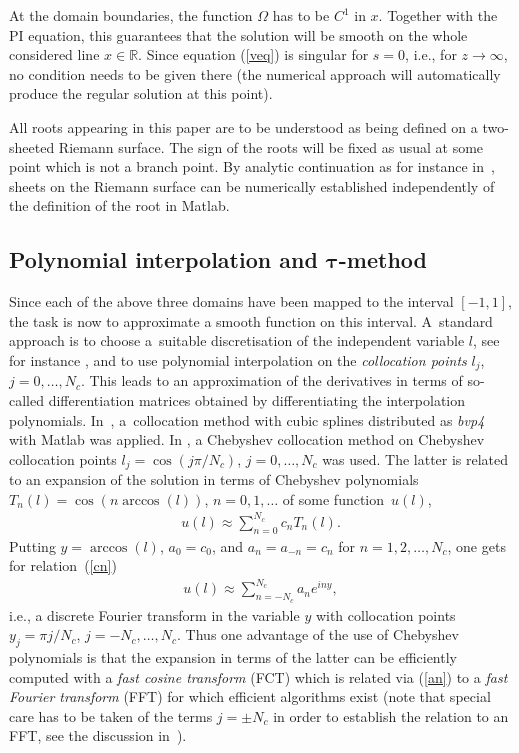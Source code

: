 \documentclass[pdftex]{sigma}
\begin{document}
At the domain boundaries, the function $\Omega$ has to be $C^{1}$ in $x$. Together with the PI equation, this guarantees that the solution will be smooth on the whole considered line $x\in \mathbb{R}$. Since equation (\ref{veq}) is singular for $s=0$, i.e., for $z\to\infty$, no condition needs to be given there (the numerical approach will automatically produce the regular solution at this point).
\begin{remark} All roots appearing in this paper are to be understood as being defined on a two-sheeted Riemann surface. The sign of the roots will be fixed as usual at some point which is not a branch point. By analytic continuation as for instance in~\cite{FK}, sheets on the Riemann surface can be numerically established independently of the definition of the root in Matlab.
\end{remark}

\subsection[Polynomial interpolation and $\tau$-method]{Polynomial interpolation and $\boldsymbol{\tau}$-method}
 Since each of the above three domains have been mapped to the interval $[-1,1]$, the task is now to approximate a smooth function on this interval. A~standard approach is to choose a~suitable discretisation of the independent variable $l$, see for instance \cite{chebop, trefethen,WR}, and to use polynomial interpolation on the \emph{collocation points} $l_{j}$, $j=0,\ldots,N_{c}$. This leads to an approximation of the derivatives in terms of so-called differentiation matrices obtained by differentiating the interpolation polynomials. In~\cite{GK1}, a~collocation method with cubic splines distributed as \emph{bvp4} with Matlab was applied. In \cite{GK12}, a Chebyshev collocation method on Chebyshev collocation points $l_{j}=\cos(j\pi/N_{c})$, $j=0,\ldots,N_{c}$ was used. The latter is related to an expansion of the solution in terms of Chebyshev polynomials $T_{n}(l)=\cos(n\arccos(l))$, $n=0,1,\ldots$ of some func\-tion~$u(l)$,
\begin{gather}
 u(l)\approx\sum_{n=0}^{N_{c}}c_{n}T_{n}(l). \label{cn}
\end{gather}
Putting $y=\arccos(l)$, $a_{0}=c_{0}$, and $a_{n}=a_{-n}=c_{n}$ for $n=1,2,\ldots,N_{c}$, one gets for rela\-tion~(\ref{cn})
\begin{gather}
 u(l)\approx\sum_{n=-N_{c}}^{N_{c}}a_{n}e^{in y} \label{an},
\end{gather}
i.e., a discrete Fourier transform in the variable $y$ with collocation points $y_{j}=\pi j/N_{c}$, $j=-N_{c},\ldots,N_{c}$. Thus one advantage of the use of Chebyshev polynomials is that the expansion in terms of the latter can be efficiently computed with a \emph{fast cosine transform} (FCT) which is related via (\ref{an}) to a \emph{fast Fourier transform} (FFT) for which efficient algorithms exist (note that special care has to be taken of the terms $j=\pm N_{c}$ in order to establish the relation to an FFT, see the discussion in~\cite{trefethen}).
\end{document}
